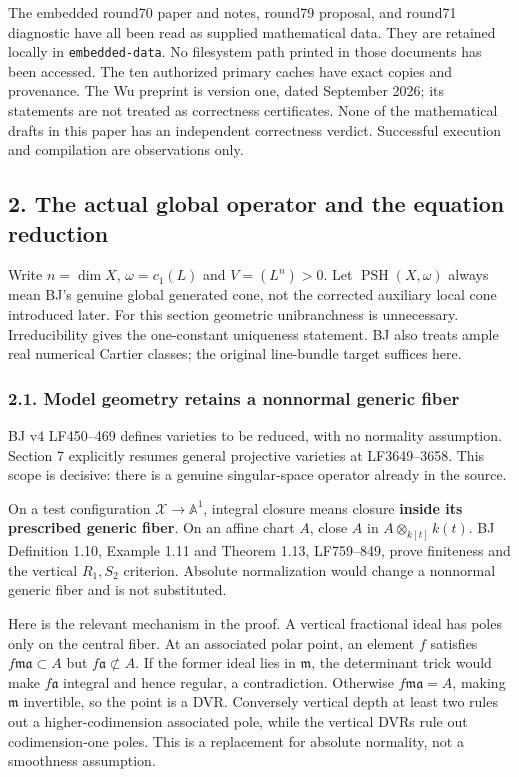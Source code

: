 \documentclass[
  10pt,
]{article}
\begin{document}
The embedded round70 paper and notes, round79 proposal, and round71
diagnostic have all been read as supplied mathematical data. They are
retained locally in \texttt{embedded-data}. No filesystem path printed
in those documents has been accessed. The ten authorized primary caches
have exact copies and provenance. The Wu preprint is version one, dated
September 2026; its statements are not treated as correctness
certificates. None of the mathematical drafts in this paper has an
independent correctness verdict. Successful execution and compilation
are observations only.

\subsection{2. The actual global operator and the equation
reduction}\label{the-actual-global-operator-and-the-equation-reduction}

Write \(n=\dim X\), \(\omega=c_1(L)\) and \(V=(L^n)>0\). Let
\(\operatorname{PSH}(X,\omega)\) always mean BJ's genuine global
generated cone, not the corrected auxiliary local cone introduced later.
For this section geometric unibranchness is unnecessary. Irreducibility
gives the one-constant uniqueness statement. BJ also treats ample real
numerical Cartier classes; the original line-bundle target suffices
here.

\subsubsection{2.1. Model geometry retains a nonnormal generic
fiber}\label{model-geometry-retains-a-nonnormal-generic-fiber}

BJ v4 LF450--469 defines varieties to be reduced, with no normality
assumption. Section 7 explicitly resumes general projective varieties at
LF3649--3658. This scope is decisive: there is a genuine singular-space
operator already in the source.

On a test configuration \(\mathcal X\to\mathbb A^1\), integral closure
means closure \textbf{inside its prescribed generic fiber}. On an affine
chart \(A\), close \(A\) in \(A\otimes_{k[t]}k(t)\). BJ Definition 1.10,
Example 1.11 and Theorem 1.13, LF759--849, prove finiteness and the
vertical \(R_1,S_2\) criterion. Absolute normalization would change a
nonnormal generic fiber and is not substituted.

Here is the relevant mechanism in the proof. A vertical fractional ideal
has poles only on the central fiber. At an associated polar point, an
element \(f\) satisfies \(f\mathfrak m\mathfrak a\subset A\) but
\(f\mathfrak a\not\subset A\). If the former ideal lies in
\(\mathfrak m\), the determinant trick would make \(f\mathfrak a\)
integral and hence regular, a contradiction. Otherwise
\(f\mathfrak m\mathfrak a=A\), making \(\mathfrak m\) invertible, so the
point is a DVR. Conversely vertical depth at least two rules out a
higher-codimension associated pole, while the vertical DVRs rule out
codimension-one poles. This is a replacement for absolute normality, not
a smoothness assumption.
\end{document}

